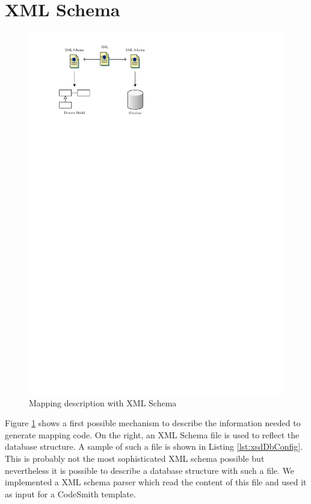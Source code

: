 	\section{XML Schema}
		\begin{figure}[htb]
			\begin{center}
				\includegraphics{./files/inc/figures/caseStudyXmlSchema}
				\caption{\label{fig:caseStudyXmlSchema} Mapping description with XML Schema}
			\end{center}
		\end{figure}
		Figure \ref{fig:caseStudyXmlSchema} shows a first possible mechanism to describe
		the information needed to generate mapping code. On the right, an XML Schema file
		is used to reflect the database structure. A sample of such a file is shown in 
		Listing \ref{lst:xsdDbConfig}. This is probably not the most sophisticated
		XML schema possible but nevertheless it is possible to describe a database structure
		with such a file. We implemented a XML schema parser which read the content of
		this file and used it as input for a CodeSmith template.
		
